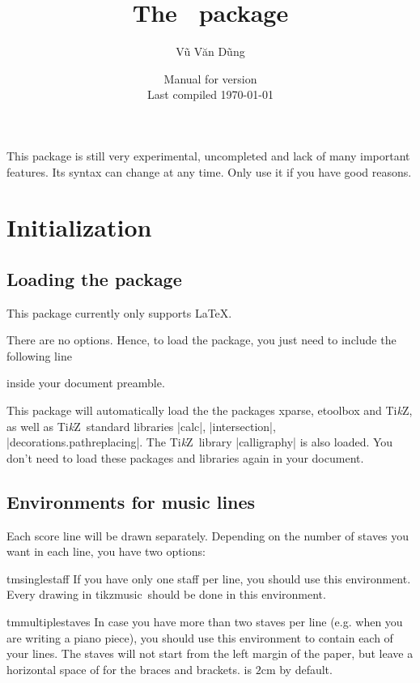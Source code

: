 \documentclass[11pt,a4paper]{ltxdoc}
\title{The \tmname\ package}
\author{Vũ Văn Dũng}
\date{Manual for version \tmversion\\Last compiled \today}
\newcommand\pkg[1]{{\sffamily #1}}
\newcommand\tmname{\pkg{tikzmusic}}
\newcommand\tikzname{Ti\emph{k}Z}
\begin{document}
\maketitle
\begin{caution}
  This package is still very experimental, uncompleted and lack of many important 
  features. Its syntax can change at any time. Only use it if you have good 
  reasons.
\end{caution}
\tableofcontents
\setlength\parskip{1ex}
\section{Initialization}\label{sec:init}
\subsection{Loading the package}\label{sec:init:load}
This package currently only supports \LaTeX.

There are no options. Hence, to load the package, you just need to 
include the following line
\begin{dispListing}
\usepackage{tikzmusic}
\end{dispListing}
inside your document preamble.

This package will automatically load the the packages \pkg{xparse}, \pkg{etoolbox} 
and \tikzname, as well as \tikzname\ standard libraries |calc|, 
|intersection|, |decorations.pathreplacing|. The \tikzname\ library |calligraphy| 
is also loaded. You don't need to load these packages and libraries again in your 
document.
\subsection{Environments for music lines}\label{sec:init:drawing-environment}
Each score line will be drawn separately. Depending on the number of staves you 
want in each line, you have two options:

\begin{docEnvironment}[doclang/environment content=music line]{tmsinglestaff}{}
  If you have only one staff per line, you should use this environment. 
  Every drawing in \tmname\ should be done in this environment.
\end{docEnvironment}
\begin{docEnvironment}[doclang/environment content=music line]{tmmultiplestaves}{}
  In case you have more than two staves per line (e.g. when you are writing a 
  piano piece), you should use this environment to contain each of your lines. 
  The staves will not start from the left margin of the paper, but leave a 
  horizontal space of  for the braces and brackets.  
  is $2$cm by default.
\end{docEnvironment}
\end{document}
